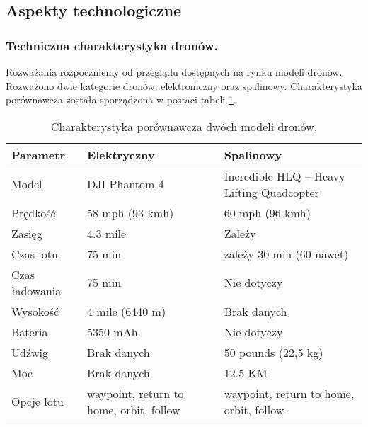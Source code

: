 \documentclass[twoside, 12pt]{article}
\begin{document}
\subsection{Aspekty technologiczne}



\subsubsection{Techniczna charakterystyka dronów.}
\par Rozważania rozpoczniemy od przeglądu dostępnych na rynku modeli dronów. Rozważono dwie kategorie dronów: elektroniczny oraz spalinowy. Charakterystyka porównawcza została sporządzona w postaci tabeli \ref{tab:drony}.

\begin{table}[h]
	\centering
	\begin{tabular}{|l|p{5.5cm}|p{5.5cm}|}
		\hline Parametr & Elektryczny & Spalinowy\\
		\hline Model & DJI Phantom 4 & Incredible HLQ – Heavy Lifting Quadcopter\\
		\hline Prędkość & 58 mph (93 kmh) & 60 mph (96 kmh)	\\
		\hline Zasięg & 4.3 mile & Zależy\\
		\hline Czas lotu & 75 min & zależy  30 min (60 nawet)\\
		\hline Czas ładowania & 75 min & Nie dotyczy\\
		\hline Wysokość & 4 mile (6440 m) & Brak danych\\
		\hline Bateria & 5350 mAh & Nie dotyczy\\
		\hline Udźwig & Brak danych & 50 pounds (22,5 kg)\\
		\hline Moc	& Brak danych & 12.5 KM\\
		\hline Opcje lotu & waypoint, return to home, orbit, follow & waypoint, return to home, orbit, follow\\
		\hline
	\end{tabular}
	\caption{Charakterystyka porównawcza dwóch modeli dronów.\label{tab:drony}}
\end{table}
\end{document}

